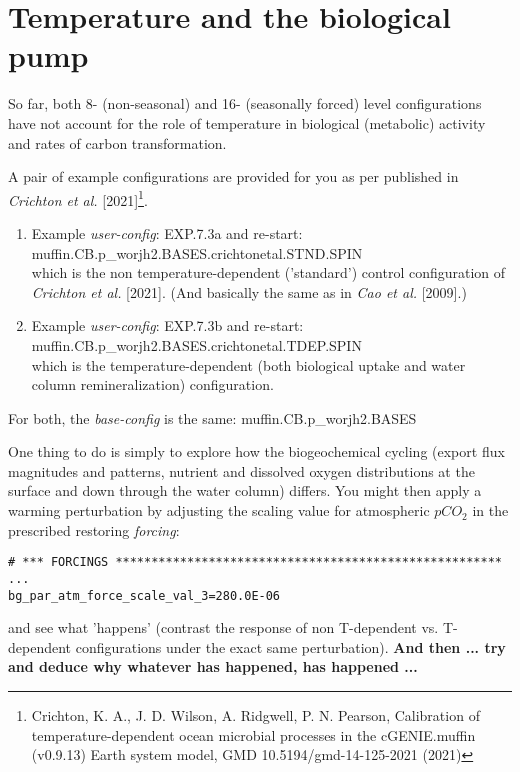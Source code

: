 \section{Temperature and the biological pump}

So far, both 8- (non-seasonal) and 16- (seasonally forced) level configurations have not account for the role of temperature in biological (metabolic) activity and rates of carbon transformation.

\vspace{1mm}
A pair of example configurations are provided for you as per published in \textit{Crichton et al.} [2021]\footnote{Crichton, K. A., J. D. Wilson, A. Ridgwell, P. N. Pearson, Calibration of temperature-dependent ocean microbial processes in the cGENIE.muffin (v0.9.13) Earth system model, GMD 10.5194/gmd-14-125-2021 (2021)}. 

\begin{enumerate}[noitemsep]
\vspace{1mm}
\item Example \textit{user-config}: \textsf{\footnotesize EXP.7.3a} and re-start: \textsf{\footnotesize muffin.CB.p\_worjh2.BASES.crichtonetal.STND.SPIN}
\\which is the non temperature-dependent ('standard') control configuration of \textit{Crichton et al.} [2021]. (And basically the same as in \textit{Cao et al.} [2009].) 
\vspace{1mm}
\item Example \textit{user-config}: \textsf{\footnotesize EXP.7.3b} and re-start: \textsf{\footnotesize muffin.CB.p\_worjh2.BASES.crichtonetal.TDEP.SPIN}
\\which is the temperature-dependent (both biological uptake and water column remineralization) configuration. 
\end{enumerate}

\vspace{1mm}
For both, the \textit{base-config} is the same: \textsf{\footnotesize muffin.CB.p\_worjh2.BASES}

\vspace{1mm}
\noindent One thing to do is simply to explore how the biogeochemical cycling (export flux magnitudes and patterns, nutrient and dissolved oxygen distributions at the surface and down through the water column) differs. You might then apply a warming perturbation by adjusting the scaling value for atmospheric \(pCO_{2}\) in the prescribed restoring \textit{forcing}:

\vspace{-2mm}\small\begin{verbatim}
# *** FORCINGS ******************************************************
...
bg_par_atm_force_scale_val_3=280.0E-06
\end{verbatim}\normalsize\vspace{-2mm}
and see what 'happens' (contrast the response of non T-dependent vs. T-dependent configurations under the exact same perturbation). \textbf{And then ... try and deduce why whatever has happened, has happened ...}

